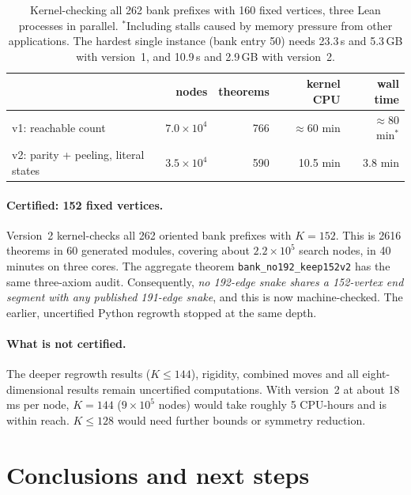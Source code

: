 \documentclass[11pt,a4paper]{article}
\theoremstyle{definition}
\begin{document}
\begin{table}[ht]
\centering\small
\begin{tabular}{lrrrr}
\toprule
 & nodes & theorems & kernel CPU & wall time\\
\midrule
v1: reachable count & $7.0\times10^4$ & 766 & $\approx 60$ min & $\approx 80$ min$^\ast$\\
v2: parity + peeling, literal states & $3.5\times10^4$ & 590 & 10.5 min & 3.8 min\\
\bottomrule
\end{tabular}
\caption{Kernel-checking all 262 bank prefixes with 160 fixed vertices, three Lean processes in parallel. $^\ast$Including stalls caused by memory pressure from other applications. The hardest single instance (bank entry 50) needs 23.3\,s and 5.3\,GB with version~1, and 10.9\,s and 2.9\,GB with version~2.}
\label{tab:leanbench}
\end{table}

\paragraph{Certified: 152 fixed vertices.} Version~2 kernel-checks all 262 oriented bank prefixes with $K=152$. This is 2616 theorems in 60 generated modules, covering about $2.2\times10^5$ search nodes, in 40 minutes on three cores. The aggregate theorem \texttt{bank\_no192\_keep152v2} has the same three-axiom audit. Consequently, \emph{no 192-edge snake shares a 152-vertex end segment with any published 191-edge snake}, and this is now machine-checked. The earlier, uncertified Python regrowth stopped at the same depth.

\paragraph{What is not certified.} The deeper regrowth results ($K\le 144$), rigidity, combined moves and all eight-dimensional results remain uncertified computations. With version~2 at about 18\,ms per node, $K=144$ ($9\times10^5$ nodes) would take roughly 5 CPU-hours and is within reach. $K\le128$ would need further bounds or symmetry reduction.

\section{Conclusions and next steps}
\end{document}
